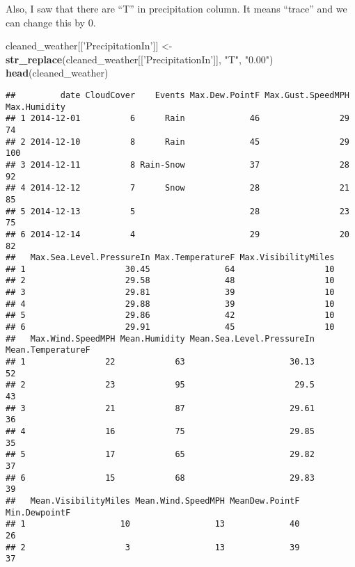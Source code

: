 \documentclass[
]{article}
\newenvironment{Shaded}{\begin{snugshade}}{\end{snugshade}}
\newcommand{\KeywordTok}[1]{\textcolor[rgb]{0.13,0.29,0.53}{\textbf{#1}}}
\newcommand{\NormalTok}[1]{#1}
\newcommand{\StringTok}[1]{\textcolor[rgb]{0.31,0.60,0.02}{#1}}
\begin{document}
Also, I saw that there are ``T'' in precipitation column. It means
``trace'' and we can change this by 0.

\begin{Shaded}
\begin{Highlighting}[]
\NormalTok{cleaned_weather[[}\StringTok{'PrecipitationIn'}\NormalTok{]] <-}\StringTok{ }\KeywordTok{str_replace}\NormalTok{(cleaned_weather[[}\StringTok{'PrecipitationIn'}\NormalTok{]], }\StringTok{"T"}\NormalTok{, }\StringTok{"0.00"}\NormalTok{)}
\KeywordTok{head}\NormalTok{(cleaned_weather)}
\end{Highlighting}
\end{Shaded}

\begin{verbatim}
##         date CloudCover    Events Max.Dew.PointF Max.Gust.SpeedMPH Max.Humidity
## 1 2014-12-01          6      Rain             46                29           74
## 2 2014-12-10          8      Rain             45                29          100
## 3 2014-12-11          8 Rain-Snow             37                28           92
## 4 2014-12-12          7      Snow             28                21           85
## 5 2014-12-13          5                       28                23           75
## 6 2014-12-14          4                       29                20           82
##   Max.Sea.Level.PressureIn Max.TemperatureF Max.VisibilityMiles
## 1                    30.45               64                  10
## 2                    29.58               48                  10
## 3                    29.81               39                  10
## 4                    29.88               39                  10
## 5                    29.86               42                  10
## 6                    29.91               45                  10
##   Max.Wind.SpeedMPH Mean.Humidity Mean.Sea.Level.PressureIn Mean.TemperatureF
## 1                22            63                     30.13                52
## 2                23            95                      29.5                43
## 3                21            87                     29.61                36
## 4                16            75                     29.85                35
## 5                17            65                     29.82                37
## 6                15            68                     29.83                39
##   Mean.VisibilityMiles Mean.Wind.SpeedMPH MeanDew.PointF Min.DewpointF
## 1                   10                 13             40            26
## 2                    3                 13             39            37

\end{verbatim}
\end{document}
